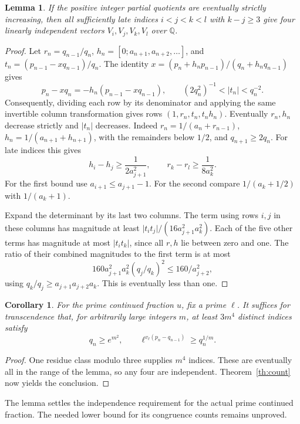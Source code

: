\documentclass[11pt,a4paper]{article}
\newcommand{\Q}{\mathbb Q}\newcommand{\Z}{\mathbb Z}\newcommand{\PP}{\mathbb P}\newcommand{\SL}{\mathrm{SL}}
\newtheorem{lemma}[theorem]{Lemma}
\newtheorem{corollary}[theorem]{Corollary}
\begin{document}
\begin{lemma}\label{lem:four}
If the positive integer partial quotients are eventually strictly increasing, then all sufficiently late indices \(i<j<k<l\) with \(k-j\ge3\) give four linearly independent vectors \(V_i,V_j,V_k,V_l\) over \(\Q\).
\end{lemma}
\begin{proof}
Let \(r_n=q_{n-1}/q_n\), \(h_n=[0;a_{n+1},a_{n+2},\ldots]\), and \(t_n=(p_{n-1}-xq_{n-1})/q_n\). The identity \(x=(p_n+h_np_{n-1})/(q_n+h_nq_{n-1})\) gives
\[
p_n-xq_n=-h_n(p_{n-1}-xq_{n-1}),\qquad
(2q_n^2)^{-1}<|t_n|<q_n^{-2}.
\]
Consequently, dividing each row by its denominator and applying the same invertible column transformation gives rows \((1,r_n,t_n,t_nh_n)\). Eventually \(r_n,h_n\) decrease strictly and \(|t_n|\) decreases. Indeed \(r_n=1/(a_n+r_{n-1})\), \(h_n=1/(a_{n+1}+h_{n+1})\), with the remainders below \(1/2\), and \(q_{n+1}\ge2q_n\). For late indices this gives
\[
h_i-h_j\ge\frac1{2a_{j+1}^2},\qquad
r_k-r_l\ge\frac1{8a_k^2}.
\]
For the first bound use \(a_{i+1}\le a_{j+1}-1\). For the second compare \(1/(a_k+1/2)\) with \(1/(a_k+1)\).

Expand the determinant by its last two columns. The term using rows \(i,j\) in these columns has magnitude at least
\(\lvert t_i t_j\rvert/(16a_{j+1}^2a_k^2)\). Each of the five other terms has magnitude at most \(\lvert t_i t_k\rvert\), since all \(r,h\) lie between zero and one. The ratio of their combined magnitudes to the first term is at most
\[
160a_{j+1}^2a_k^2(q_j/q_k)^2\le160/a_{j+2}^2,
\]
using \(q_k/q_j\ge a_{j+1}a_{j+2}a_k\). This is eventually less than one.
\end{proof}

\begin{corollary}\label{cor:wolf}
For the prime continued fraction \(u\), fix a prime \(\ell\). It suffices for transcendence that, for arbitrarily large integers \(m\), at least \(3m^4\) distinct indices satisfy
\[
q_n\ge e^{m^2},\qquad \ell^{v_\ell(p_n-q_{n-1})}\ge q_n^{1/m}.
\]
\end{corollary}
\begin{proof}
One residue class modulo three supplies \(m^4\) indices. These are eventually all in the range of the lemma, so any four are independent. Theorem~\ref{th:count} now yields the conclusion.
\end{proof}
The lemma settles the independence requirement for the actual prime continued fraction. The needed lower bound for its congruence counts remains unproved.
\end{document}

